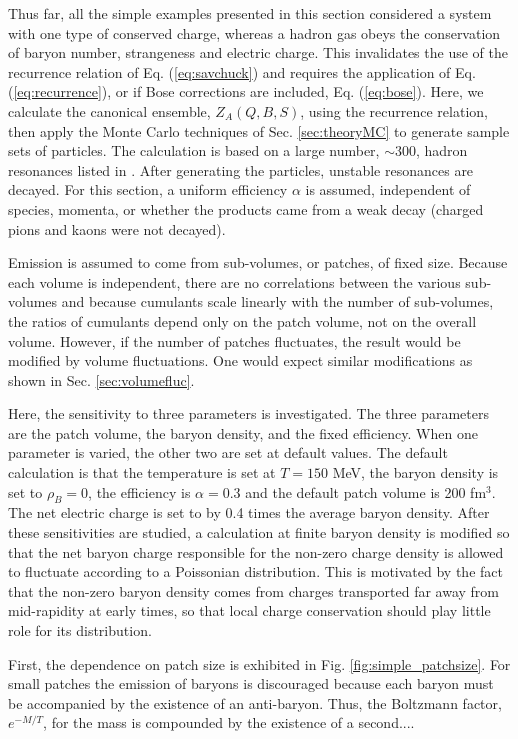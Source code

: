 \documentclass[aps,prc,nofootinbib,showpacs,superscriptaddress,groupedaddress]{revtex4-1}
\begin{document}
Thus far, all the simple examples presented in this section considered a system with one type of conserved charge, whereas a hadron gas obeys the conservation of baryon number, strangeness and electric charge. This invalidates the use of the recurrence relation of Eq. (\ref{eq:savchuck}) and requires the application of Eq. (\ref{eq:recurrence}), or if Bose corrections are included, Eq. (\ref{eq:bose}). Here, we calculate the canonical ensemble, $Z_A(Q,B,S)$, using the recurrence relation, then apply the Monte Carlo techniques of Sec. \ref{sec:theoryMC} to generate sample sets of particles. The calculation is based on a large number, $\sim 300$, hadron resonances listed in \cite{Tanabashi:2018oca}. After generating the particles, unstable resonances are decayed. For this section, a uniform efficiency $\alpha$ is assumed, independent of species, momenta, or whether the products came from a weak decay (charged pions and kaons were not decayed).

Emission is assumed to come from sub-volumes, or patches, of fixed size. Because each volume is independent, there are no correlations between the various sub-volumes and because cumulants scale linearly with the number of sub-volumes, the ratios of cumulants depend only on the patch volume, not on the overall volume. However, if the number of patches fluctuates, the result would be modified by volume fluctuations. One would expect similar modifications as shown in Sec. \ref{sec:volumefluc}.

Here, the sensitivity to three parameters is investigated. The three parameters are the patch volume, the baryon density, and the fixed efficiency. When one parameter is varied, the other two are set at default values. The default calculation is that the temperature is set at $T=150$ MeV, the baryon density is set to $\rho_B=0$, the efficiency is $\alpha=0.3$ and the default patch volume is 200 fm$^3$. The net electric charge is set to by 0.4 times the average baryon density. After these sensitivities are studied, a calculation at finite baryon density is modified so that the net baryon charge responsible for the non-zero charge density is allowed to fluctuate according to a Poissonian distribution. This is motivated by the fact that the non-zero baryon density comes from charges transported far away from mid-rapidity at early times, so that local charge conservation should play little role for its distribution.

First, the dependence on patch size is exhibited in  Fig. \ref{fig:simple_patchsize}. For small patches the emission of baryons is discouraged because each baryon must be accompanied by the existence of an anti-baryon. Thus, the Boltzmann factor, $e^{-M/T}$, for the mass is compounded by the existence of a second....
\end{document}
